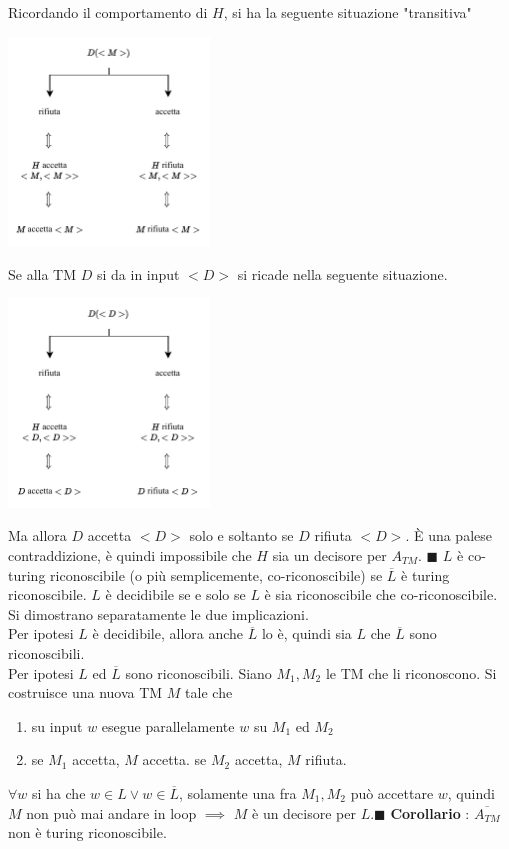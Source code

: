 \documentclass[10pt, letterpaper]{report}
\begin{document}
Ricordando il comportamento di $H$, si ha la seguente situazione "transitiva"
\begin{center}
    \includegraphics[width=0.4\textwidth ]{images/ATMnonDec.pdf}
\end{center}
Se alla TM $D$ si da in input $<D>$ si ricade nella seguente situazione.
\begin{center}
    \includegraphics[width=0.4\textwidth ]{images/ATMnonDec2.pdf}
\end{center}
Ma allora $D$ accetta $<D>$ solo e soltanto se $D$ rifiuta $<D>$. È una palese contraddizione, è quindi impossibile che $H$ sia un decisore per $A_{TM}$.
\hfill$\blacksquare$\acc 
{} $L$ è co-turing riconoscibile (o più semplicemente, co-riconoscibile) se $\overline{L}$ è turing riconoscibile.\acc 
\teo{} $L$ è decidibile se e solo se $L$ è sia riconoscibile che co-riconoscibile.\acc 
\dimo{} Si dimostrano separatamente le due implicazioni. \\ 
\boxedMath{$\implies$} Per ipotesi $L$ è decidibile, allora anche $\overline{L}$ lo è, quindi sia $L$ che $\overline{L}$ sono riconoscibili. \\ 
\boxedMath{$\impliedby$} Per ipotesi $L$ ed $\overline{L}$ sono riconoscibili. Siano $M_1,M_2$ le TM che li riconoscono. Si costruisce una nuova TM $M$ tale che \begin{enumerate}
    \item su input $w$ esegue parallelamente $w$ su $M_1$ ed $M_2$
    \item se $M_1$ accetta, $M$ accetta. se $M_2$ accetta, $M$ rifiuta.
\end{enumerate}
$\forall w$ si ha che $w\in L \lor w\in \overline{L}$, solamente una fra $M_1,M_2$ può accettare $w$, quindi $M$ non può mai andare in loop $\implies$ $M$ è un decisore per $L$.\hfill$\blacksquare$\acc 
\textbf{Corollario} : $\overline{A_{TM}}$ non è turing riconoscibile.\flowerLine 
\end{document}
